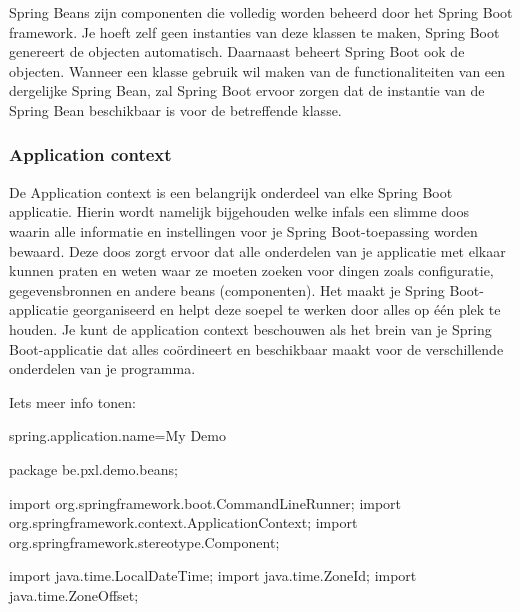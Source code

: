 Spring Beans zijn componenten die volledig worden beheerd door het Spring Boot framework. Je hoeft zelf geen instanties van deze klassen te maken, Spring Boot genereert de objecten automatisch.  Daarnaast beheert Spring Boot ook de objecten. Wanneer een klasse gebruik wil maken van de functionaliteiten van een dergelijke Spring Bean, zal Spring Boot ervoor zorgen dat de instantie van de Spring Bean beschikbaar is voor de betreffende klasse.

\subsubsection{Application context}

De Application context is een belangrijk onderdeel van elke Spring Boot applicatie.
Hierin wordt namelijk bijgehouden welke infals een slimme doos waarin alle informatie en instellingen voor je Spring Boot-toepassing worden bewaard. Deze doos zorgt ervoor dat alle onderdelen van je applicatie met elkaar kunnen praten en weten waar ze moeten zoeken voor dingen zoals configuratie, gegevensbronnen en andere beans (componenten). Het maakt je Spring Boot-applicatie georganiseerd en helpt deze soepel te werken door alles op één plek te houden. Je kunt de application context beschouwen als het brein van je Spring Boot-applicatie dat alles coördineert en beschikbaar maakt voor de verschillende onderdelen van je programma.


Iets meer info tonen:

spring.application.name=My Demo

package be.pxl.demo.beans;

import org.springframework.boot.CommandLineRunner;
import org.springframework.context.ApplicationContext;
import org.springframework.stereotype.Component;

import java.time.LocalDateTime;
import java.time.ZoneId;
import java.time.ZoneOffset;

